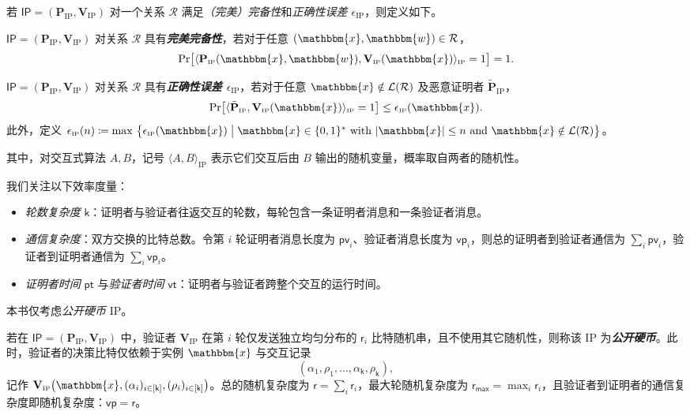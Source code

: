 \documentclass[american,singlepageview]{snargs-book-zh}
\newcommand{\defemph}[1]{\textbf{\emph{#1}}}
\newcommand{\Bits}{\{0,1\}}
\newcommand{\Malicious}[1]{\tilde{#1}}
\newcommand{\Interact}[2]{\langle #1, #2 \rangle}
\newcommand{\DefineEqual}{\coloneqq}
\newcommand{\SomeSize}[1]{|#1|}
\newcommand{\Relation}{\mathcal{R}}
\newcommand{\Language}{\mathcal{L}}
\newcommand{\GetLanguage}[1]{\Language(#1)}
\newcommand{\Instance}{\mathbbm{x}}
\newcommand{\Witness}{\mathbbm{w}}
\newcommand{\InstanceSize}{n}
\newcommand{\ProtoProver}{P}
\newcommand{\ProtoVerifier}{V}
\newcommand{\ProtoSoundnessError}{\epsilon}
\newcommand{\ProtoRoundComplexity}{\mathsf{k}}
\newcommand{\ProtoRandomnessComplexity}{\mathsf{r}}
\newcommand{\ProtoProverTime}{\mathsf{pt}}
\newcommand{\ProtoVerifierTime}{\mathsf{vt}}
\newcommand{\ProtoPToVComplexity}{\mathsf{pv}}
\newcommand{\ProtoVToPComplexity}{\mathsf{vp}}
\newcommand{\RoundIndex}{i}
\newcommand{\IPSymbol}{\mathsf{IP}}
\newcommand{\IPSystem}{(\IPProver,\IPVerifier)}
\newcommand{\IPSubscript}{\scriptscriptstyle\mathrm{IP}}
\newcommand{\IPInteract}[2]{\Interact{#1}{#2}_{\IPSubscript}}
\newcommand{\IPFormat}[1]{\mathbf{#1}}
\newcommand{\IPProver}{\IPFormat{\ProtoProver}_{\IPSubscript}}
\newcommand{\IPVerifier}{\IPFormat{\ProtoVerifier}_{\IPSubscript}}
\newcommand{\IPSoundnessError}{\ProtoSoundnessError_{\IPSubscript}}
\newcommand{\IPMaliciousProver}{\Malicious{\IPFormat{\ProtoProver}}_{\IPSubscript}}
\newcommand{\IPRoundComplexity}{\ProtoRoundComplexity}
\newcommand{\IPRandomnessComplexity}{\ProtoRandomnessComplexity}
\newcommand{\IPMaxRandomnessComplexity}{\IPRandomnessComplexity_{{\scriptscriptstyle\mathsf{max}}}}
\newcommand{\IPPToVComplexity}{\ProtoPToVComplexity}
\newcommand{\IPVToPComplexity}{\ProtoVToPComplexity}
\newcommand{\IPProverTime}{\ProtoProverTime}
\newcommand{\IPVerifierTime}{\ProtoVerifierTime}
\newcommand{\IPProverMessage}{\alpha}
\newcommand{\IPVerifierRandomMessage}{\rho}
\newcommand{\IPTuple}[1]{(#1_{\RoundIndex})_{\RoundIndex \in [\IPRoundComplexity]}}
\newcommand{\IPVerifierInput}{\Instance,\IPTuple{\IPProverMessage},\IPTuple{\IPVerifierRandomMessage}}
\newcommand{\MaxSoundness}[1]{\max\, \big\{ #1 \;\big\vert\;\Instance \in \Bits^{*} \text{ with } \SomeSize{\Instance} \leq \InstanceSize \text{ and } \Instance \notin \GetLanguage{\Relation} \big\}}
\begin{document}
若 $\IPSymbol=\IPSystem$ 对一个关系 $\Relation$ 满足\emph{（完美）完备性}和\emph{正确性误差 $\IPSoundnessError$}，则定义如下。

\begin{definition}
\label{definition:ip-completeness}
$\IPSymbol=\IPSystem$ 对关系 $\Relation$ 具有\defemph{完美完备性}，若对于任意 $(\Instance,\Witness)\in\Relation$，
\[
  \Pr\bigl[\IPInteract{\IPProver(\Instance,\Witness)}{\IPVerifier(\Instance)}=1\bigr]=1.
\]
\end{definition}

\begin{definition}
\label{definition:ip-soundness}
$\IPSymbol=\IPSystem$ 对关系 $\Relation$ 具有\defemph{正确性误差 $\IPSoundnessError$}，若对于任意 $\Instance\notin\GetLanguage{\Relation}$ 及恶意证明者 $\IPMaliciousProver$，
\[
  \Pr\bigl[\IPInteract{\IPMaliciousProver}{\IPVerifier(\Instance)}=1\bigr]
  \le \IPSoundnessError(\Instance).
\]
此外，定义 $\IPSoundnessError(\InstanceSize)\DefineEqual\MaxSoundness{\IPSoundnessError(\Instance)}$。
\end{definition}

其中，对交互式算法 $A,B$，记号 $\IPInteract{A}{B}$ 表示它们交互后由 $B$ 输出的随机变量，概率取自两者的随机性。

我们关注以下效率度量：
\begin{itemize}
  \item \emph{轮数复杂度} $\IPRoundComplexity$：证明者与验证者往返交互的轮数，每轮包含一条证明者消息和一条验证者消息。
  \item \emph{通信复杂度}：双方交换的比特总数。令第 $\RoundIndex$ 轮证明者消息长度为 $\IPPToVComplexity_{\RoundIndex}$、验证者消息长度为 $\IPVToPComplexity_{\RoundIndex}$，则总的证明者到验证者通信为 $\sum_{\RoundIndex}\IPPToVComplexity_{\RoundIndex}$，验证者到证明者通信为 $\sum_{\RoundIndex}\IPVToPComplexity_{\RoundIndex}$。
  \item \emph{证明者时间} $\IPProverTime$ 与\emph{验证者时间} $\IPVerifierTime$：证明者与验证者跨整个交互的运行时间。
\end{itemize}

本书仅考虑\emph{公开硬币} IP。

\begin{definition}
\label{definition:ip-public-coin}
若在 $\IPSymbol=\IPSystem$ 中，验证者 $\IPVerifier$ 在第 $\RoundIndex$ 轮仅发送独立均匀分布的 $\IPRandomnessComplexity_{\RoundIndex}$ 比特随机串，且不使用其它随机性，则称该 IP 为\defemph{公开硬币}。此时，验证者的决策比特仅依赖于实例 $\Instance$ 与交互记录
\[
  (\IPProverMessage_{1},\IPVerifierRandomMessage_{1},\dots,\IPProverMessage_{\IPRoundComplexity},\IPVerifierRandomMessage_{\IPRoundComplexity}),
\]
记作
\(\IPVerifier\big(\IPVerifierInput\big)\)。总的随机复杂度为
\(\IPRandomnessComplexity=\sum_{\RoundIndex}\IPRandomnessComplexity_{\RoundIndex}\)，最大轮随机复杂度为 \(\IPMaxRandomnessComplexity=\max_{\RoundIndex}\IPRandomnessComplexity_{\RoundIndex}\)，且验证者到证明者的通信复杂度即随机复杂度：\(\IPVToPComplexity=\IPRandomnessComplexity\)。
\end{definition}
\end{document}
